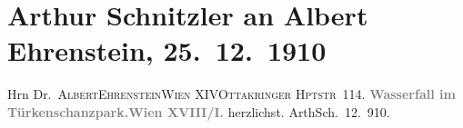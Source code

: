 

         
         \renewcommand{\erwaehntePersonen}{Personen: Albert Ehrenstein}
         \renewcommand{\erwaehnteOrte}{Orte: Ottakringerstraße, Türkenschanzpark, Wien, XIV., Penzing}
         \renewcommand{\erwaehnteWerke}{}
               \section[Arthur Schnitzler an Albert Ehrenstein, 25. 12. 1910]{ Arthur Schnitzler an Albert Ehrenstein, 25. 12. 1910}\nopagebreak{}\rehead{ }\begin{ledgroupsized}[t]{13cm}\normalsize\beginnumbering \toendnotes[C]{\smallbreak\pagebreak[2]} 
\toendnotes[C]{\smallbreak}\pstart{}{\pb}Hrn Dr. \textsc{Albert}\pend{}\pstart{}\textsc{Ehrenstein}\pend{}\pstart{}\textsc{Wien XIV}\pend{}\pstart{}\textsc{Ottakringer Hptstr 114.}\pend{}{\bigskip}\pstart
           \noindent{}\centering{}{\pb}\textcolor{gray}{\textbf{Wasserfall im Türkenschanzpark.\hspace*{1.5em}Wien
                     XVIII/I.}}\pend
           \pstart
           {\pb}\label{K_L01994_1v}\label{K_L01994_1h} herzlichst.\pend
           \pstart \spacefill\mbox{ArthSch}\pend{}. 12. 910.\pend
           
         
         \endnumbering{}\end{ledgroupsized}  \newcommand{\dateiname}{L01994}\newcommand{\titel}{Arthur Schnitzler an Albert Ehrenstein, 25. 12. 1910}\newcommand{\editorInnen}{Martin Anton Müller und Gerd-Hermann Susen}
      